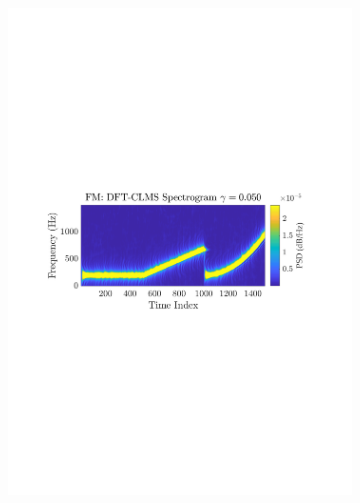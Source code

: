 \documentclass[12pt]{article}
\begin{document}
\begin{figure}[H]
\begin{subfigure}{0.49\textwidth}
					\includegraphics[trim={2.2cm 11.2cm 3.00cm  11.2cm}, clip, width=\textwidth]{../MATLAB/figures/q3_3c_fig03.pdf} 
					\captionsetup{justification=centering}
				\end{subfigure}
			

\end{figure}
\end{document}
